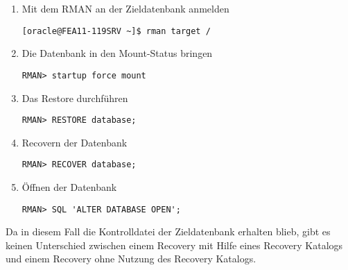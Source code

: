         \begin{enumerate}
          \item Mit dem RMAN an der Zieldatenbank anmelden
            \begin{lstlisting}[caption={An der Zieldatenbank anmelden},label=admin1440,language=rman]
[oracle@FEA11-119SRV ~]$ rman target /
            \end{lstlisting}
          \item Die Datenbank in den Mount-Status bringen
            \begin{lstlisting}[caption={Datenbank mounten},label=admin1441,language=rman,alsolanguage=sqlplus]
RMAN> startup force mount
          \end{lstlisting}
          \item Das Restore durchf\"uhren
            \begin{lstlisting}[caption={Restore der Datendateien},label=admin1442,language=rman]
RMAN> RESTORE database;
            \end{lstlisting}
          \item Recovern der Datenbank
            \begin{lstlisting}[caption={Recovery der Datenbank},label=admin1443,language=rman]
RMAN> RECOVER database;
            \end{lstlisting}
          \item \"Offnen der Datenbank
            \begin{lstlisting}[caption={\"Offnen der Datenbank nach dem Recovery},label=admin1444,language=rman,emph={[10]ALTER,DATABASE,OPEN},emphstyle={[10]\color{magenta}\bfseries}]
RMAN> SQL 'ALTER DATABASE OPEN';
            \end{lstlisting}
        \end{enumerate}
        \begin{merke}
          Da in diesem Fall die Kontrolldatei der Zieldatenbank erhalten blieb,
          gibt es keinen Unterschied zwischen einem Recovery mit Hilfe eines
          Recovery Katalogs und einem Recovery ohne Nutzung des Recovery
          Katalogs.
        \end{merke}
